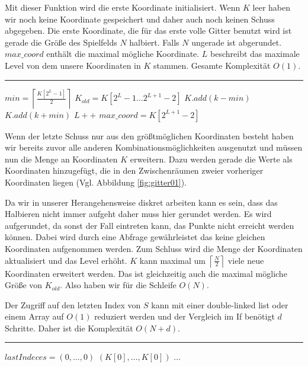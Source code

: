 \documentclass[a4paper,12pt]{llncs}
\numberwithin{equation}{section}
\begin{document}
Mit dieser Funktion wird die erste Koordinate initialisiert. Wenn $K$ leer haben wir noch keine Koordinate gespeichert und daher auch noch keinen Schuss abgegeben. Die erste Koordinate, die für das erste volle Gitter benutzt wird ist gerade die Größe des Spielfelds $N$ halbiert. Falls $N$ ungerade ist abgerundet. $max\_coord$ enthält die maximal mögliche Koordinate. $L$ beschreibt das maximale Level von dem unsere Koordinaten in $K$ stammen. Gesamte Komplexität $O(1)$.

\smallskip
\hrule
\smallskip
\begin{tcolorbox}
	\begin{algorithmic}
		\State $min=\left\lceil\frac{K[2^L-1]}{2}\right\rceil$
		\State $K_{old}=K\left[2^L-1\dots 2^{L+1}-2\right]$
		\State $K.add(k-min)$
		\EndIf
		\State $K.add(k+min)$
		\EndFor
		\State $L++$
		\State $max\_coord=K\left[2^{L+1}-2\right]$
		\EndFunction
	\end{algorithmic}
\end{tcolorbox}

Wenn der letzte Schuss nur aus den größtmöglichen Koordinaten besteht haben wir bereits zuvor alle anderen Kombinationsmöglichkeiten ausgenutzt und müssen nun die Menge an Koordinaten $K$ erweitern. Dazu werden gerade die Werte als Koordinaten hinzugefügt, die in den Zwischenräumen zweier vorheriger Koordinaten liegen (Vgl. Abbildung \ref{fig:gitter01}). 

Da wir in unserer Herangehensweise diskret arbeiten kann es sein, dass das Halbieren nicht immer aufgeht daher muss hier gerundet werden. Es wird aufgerundet, da sonst der Fall eintreten kann, das Punkte nicht erreicht werden können. Dabei wird durch eine Abfrage gewährleistet das keine gleichen Koordinaten aufgenommen werden. Zum Schluss wird die Menge der Koordinaten aktualisiert und das Level erhöht. $K$ kann maximal um $\left\lceil\frac{N}{2}\right\rceil$ viele neue Koordinaten erweitert werden. Das ist gleichzeitig auch die maximal mögliche Größe von $K_{old}$. Also haben wir für die Schleife $O(N)$. 


Der Zugriff auf den letzten Index von $S$ kann mit einer double-linked list oder einem Array auf $O(1)$ reduziert werden und der Vergleich im If benötigt $d$ Schritte. Daher ist die Komplexität $O\left(N+d\right)$.

\smallskip
\hrule
\smallskip

\begin{tcolorbox}
	\begin{algorithmic}
		\If{$S=\emptyset$}
		\State $lastIndeces = (0,\dots,0)$
		\State \Return $(K[0],\dots,K[0])$
		\Else
		\State $\dots$
		\EndIf
	\end{algorithmic}
\end{tcolorbox}
\end{document}

